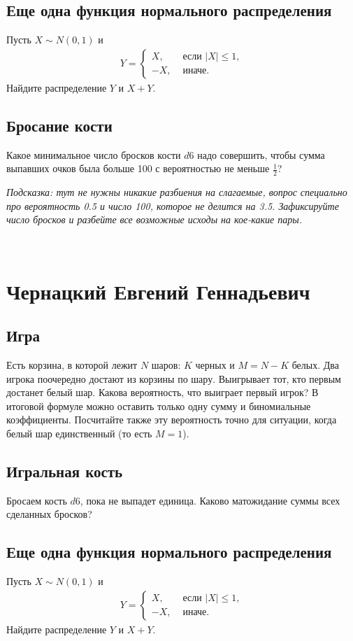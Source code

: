\documentclass[12pt]{article}
\begin{document}
\subsection{Еще одна функция нормального распределения}
Пусть $X \sim N(0, 1)$ и 
\begin{align*}
    Y = \begin{cases}
        X, &\text{ если } |X| \le 1, \\
        -X, &\text{ иначе.}
    \end{cases}
\end{align*}
Найдите распределение $Y$ и $X + Y$.

\subsection{Бросание кости}
Какое минимальное число бросков кости $d6$ надо совершить, чтобы сумма выпавших очков была больше 100 с вероятностью не меньше $\frac{1}{2}$? 

\emph{Подсказка: тут не нужны никакие разбиения на слагаемые, вопрос специально про вероятность 0.5 и число 100, которое не делится на 3.5. Зафиксируйте число бросков и разбейте все возможные исходы на кое-какие пары.}

\newpage
~
\newpage
\section{Чернацкий Евгений Геннадьевич}

\subsection{Игра}
Есть корзина, в которой лежит $N$ шаров: $K$ черных и $M = N - K$ белых. Два игрока поочередно достают из корзины по шару. Выигрывает тот, кто первым достанет белый шар. Какова вероятность, что выиграет первый игрок? В итоговой формуле можно оставить только одну сумму и биномиальные коэффициенты. Посчитайте также эту вероятность точно для ситуации, когда белый шар единственный (то есть $M = 1$).

\subsection{Игральная кость}Бросаем кость $d6$, пока не выпадет единица. Каково матожидание суммы всех сделанных бросков?

\subsection{Еще одна функция нормального распределения}
Пусть $X \sim N(0, 1)$ и 
\begin{align*}
    Y = \begin{cases}
        X, &\text{ если } |X| \le 1, \\
        -X, &\text{ иначе.}
    \end{cases}
\end{align*}
Найдите распределение $Y$ и $X + Y$.
\end{document}
